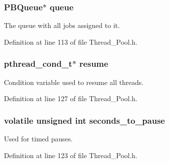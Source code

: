 \hypertarget{struct_thread___pool_a6eb567d0cc8a6098553d1f9d81ae053c}{}
\subsubsection[{queue}]{\setlength{\rightskip}{0pt plus 5cm}P\+B\+Queue$\ast$ queue}\label{struct_thread___pool_a6eb567d0cc8a6098553d1f9d81ae053c}


The queue with all jobs assigned to it. 



Definition at line 113 of file Thread\+\_\+\+Pool.\+h.

\hypertarget{struct_thread___pool_a08d1ddc052477bcca8d06a45f336f698}{}
\subsubsection[{resume}]{\setlength{\rightskip}{0pt plus 5cm}pthread\+\_\+cond\+\_\+t$\ast$ resume}\label{struct_thread___pool_a08d1ddc052477bcca8d06a45f336f698}


Condition variable used to resume all threads. 



Definition at line 127 of file Thread\+\_\+\+Pool.\+h.

\hypertarget{struct_thread___pool_aa3e740b7660eaea4b15fa0d53922fda9}{}
\subsubsection[{seconds\+\_\+to\+\_\+pause}]{\setlength{\rightskip}{0pt plus 5cm}volatile unsigned int seconds\+\_\+to\+\_\+pause}\label{struct_thread___pool_aa3e740b7660eaea4b15fa0d53922fda9}


Used for timed pauses. 



Definition at line 123 of file Thread\+\_\+\+Pool.\+h.

\hypertarget{struct_thread___pool_a2a469ce06ddf913155542574fd51e40e}{}
